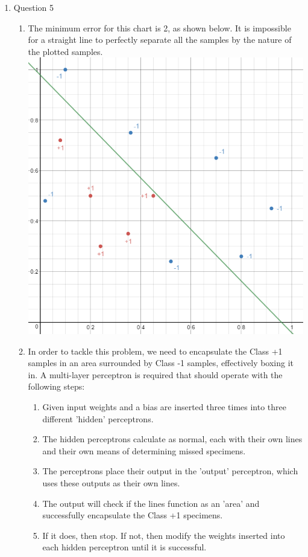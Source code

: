 \documentclass[11pt]{article}
\begin{document}
\begin{enumerate}
\begin {enumerate}
\end {enumerate}
\item Question 5
\begin {enumerate}
\item
The minimum error for this chart is 2, as shown below. It is impossible for a straight line to perfectly separate all the samples by the nature of the plotted samples.
\includegraphics[scale=0.5]{graph3}
\item
In order to tackle this problem, we need to encapsulate the Class +1 samples in an area surrounded by Class -1 samples, effectively boxing it in. A multi-layer perceptron is required that should operate with the following steps:
\begin {enumerate}
\item Given input weights and a bias are inserted three times into three different 'hidden' perceptrons.
\item The hidden perceptrons calculate as normal, each with their own lines and their own means of determining missed specimens.
\item The perceptrons place their output in the 'output' perceptron, which uses these outputs as their own lines.
\item The output will check if the lines function as an 'area' and successfully encapsulate the Class +1 specimens.
\item If it does, then stop. If not, then modify the weights inserted into each hidden perceptron until it is successful.

\end{enumerate}
\end{enumerate}
\end{enumerate}
\end{document}
